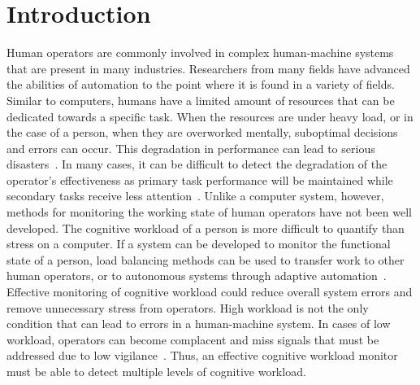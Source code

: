 \documentclass[11pt]{article}
\begin{document}
\section{Introduction}
Human operators are commonly involved in complex human-machine systems that are present in many industries. Researchers from many fields have advanced the abilities of automation to the point where it is found in a variety of fields. Similar to computers, humans have a limited amount of resources that can be dedicated towards a specific task. When the resources are under heavy load, or in the case of a person, when they are overworked mentally, suboptimal decisions and errors can occur. This degradation in performance can lead to serious disasters~\cite{Wickens}. In many cases, it can be difficult to detect the degradation of the operator's effectiveness as primary task performance will be maintained while secondary tasks receive less attention~\cite{Hockey}.  Unlike a computer system, however, methods for monitoring the working state of human operators have not been well developed. The cognitive workload of a person is more difficult to quantify than stress on a computer. If a system can be developed to monitor the functional state of a person, load balancing methods can be used to transfer work to other human operators, or to autonomous systems through adaptive automation~\cite{Wilson}. Effective monitoring of cognitive workload could reduce overall system errors and remove unnecessary stress from operators. High workload is not the only condition that can lead to errors in a human-machine system. In cases of low workload, operators can become complacent and miss signals that must be addressed due to low vigilance~\cite{Parasuraman}. Thus, an effective cognitive workload monitor must be able to detect multiple levels of cognitive workload.
\end{document}
